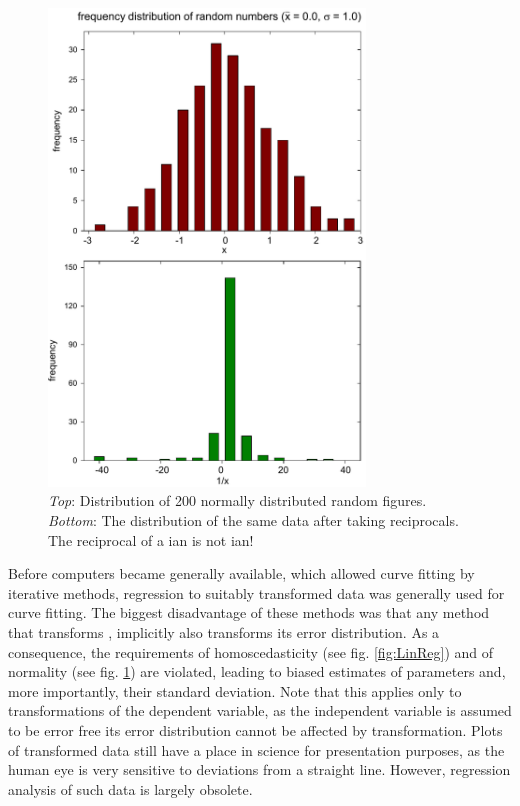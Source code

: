 \begin{refsection}
\begin{figure}
 \caption{\emph{Top}: Distribution of \num{200} normally distributed random figures. \emph{Bottom}: The distribution of the same data after taking reciprocals. The reciprocal of a ian is not ian!}
 \label{fig:RecGau}
 \centering
 \includegraphics[width=0.75\textwidth]{Graphics/Reciprocal-Gaussian}
\end{figure}

Before computers became generally available, which allowed curve fitting by iterative methods, regression to suitably transformed data was generally used for curve fitting. The biggest disadvantage of these methods was that any method that transforms , implicitly also transforms its error distribution. As a consequence, the requirements of homoscedasticity (see fig. \ref{fig:LinReg}) and of normality (see fig. \ref{fig:RecGau}) are violated, leading to biased estimates of parameters and, more importantly, their standard deviation. Note that this applies only to transformations of the dependent variable, as the independent variable is assumed to be error free its error distribution cannot be affected by transformation. Plots of transformed data still have a place in science for presentation purposes, as the human eye is very sensitive to deviations from a straight line. However, regression analysis of such data is largely obsolete.


\end{refsection}

